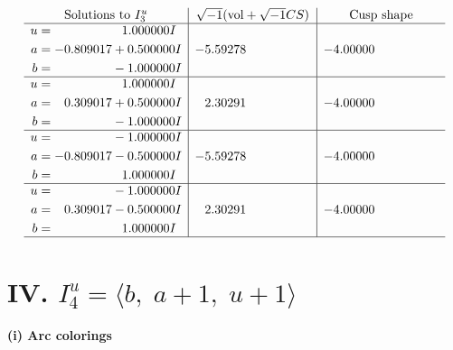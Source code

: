 \documentclass[1p]{elsarticle_modified}
\theoremstyle{definition}
\newcommand{\I}{\sqrt{-1}}
\begin{document}
$$\begin{array}{c|c|c}  
\text{Solutions to }I^u_{3}& \I (\text{vol} + \sqrt{-1}CS) & \text{Cusp shape}\\
 \hline 
\begin{aligned}
u &= \phantom{-0.000000 -}1.000000 I \\
a &= -0.809017 + 0.500000 I \\
b &= \phantom{-0.000000 } -1.000000 I\end{aligned}
 & -5.59278\phantom{ +0.000000I} & -4.00000\phantom{ +0.000000I} \\ \hline\begin{aligned}
u &= \phantom{-0.000000 -}1.000000 I \\
a &= \phantom{-}0.309017 + 0.500000 I \\
b &= \phantom{-0.000000 } -1.000000 I\end{aligned}
 & \phantom{-}2.30291\phantom{ +0.000000I} & -4.00000\phantom{ +0.000000I} \\ \hline\begin{aligned}
u &= \phantom{-0.000000 } -1.000000 I \\
a &= -0.809017 - 0.500000 I \\
b &= \phantom{-0.000000 -}1.000000 I\end{aligned}
 & -5.59278\phantom{ +0.000000I} & -4.00000\phantom{ +0.000000I} \\ \hline\begin{aligned}
u &= \phantom{-0.000000 } -1.000000 I \\
a &= \phantom{-}0.309017 - 0.500000 I \\
b &= \phantom{-0.000000 -}1.000000 I\end{aligned}
 & \phantom{-}2.30291\phantom{ +0.000000I} & -4.00000\phantom{ +0.000000I}\\
 \hline 
 \end{array}$$\newpage\newpage\renewcommand{\arraystretch}{1}
\centering \section*{IV. $I^u_{4}= \langle b,\;a+1,\;u+1 \rangle$}
\flushleft \textbf{(i) Arc colorings}\\
\end{document}
